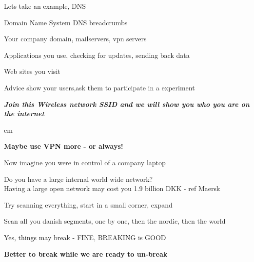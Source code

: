\documentclass[Screen16to9,17pt,footrule]{foils}
\begin{document}

\begin{list1}
\item Lets take an example, DNS
\item Domain Name System DNS breadcrumbs
\begin{list2}
\item Your company domain, mailservers, vpn servers
\item Applications you use, checking for updates, sending back data
\item Web sites you visit
\end{list2}
\vskip 1cm
\item Advice show your users,ask them to participate in a experiment
\end{list1}

\emph{\bf Join this Wireless network SSID and we will show you who you are on the internet}

 cm
\centerline{\bf\Large Maybe use VPN more - or always!}



\begin{list2}
\item
\item
\item
\end{list2}






\begin{list2}
\item Now imagine you were in control of a company laptop
\item Do you have a large internal world wide network?\\
Having a large open network may cost you 1.9 billion DKK - ref Maersk
\item Try scanning everything, start in a small corner, expand
\item Scan all you danish segments, one by one, then the nordic, then the world
\item Yes, things may break - FINE, BREAKING is GOOD
\end{list2}

\centerline{\bf Better to break while we are ready to un-break}


\myquestionspage
\end{document}

